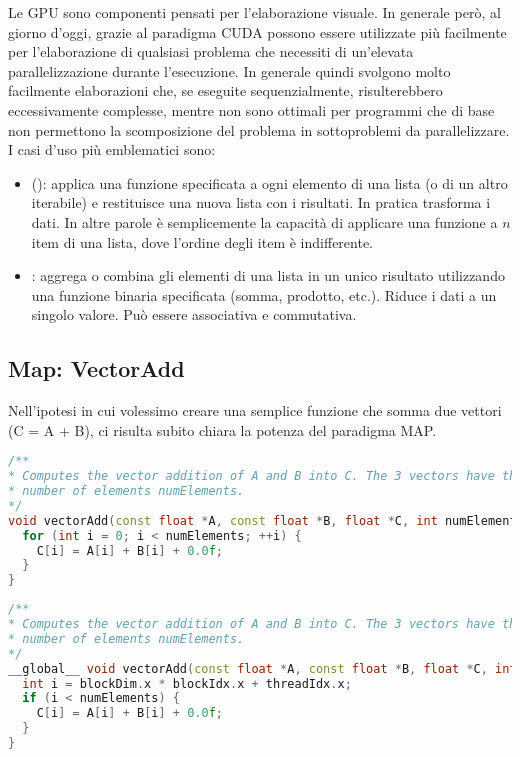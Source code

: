Le GPU sono componenti pensati per l'elaborazione visuale. In generale però, al giorno d'oggi, grazie al paradigma CUDA possono essere utilizzate più facilmente per l'elaborazione di qualsiasi problema che necessiti di un'elevata parallelizzazione durante l'esecuzione. In generale quindi svolgono molto facilmente elaborazioni che, se eseguite sequenzialmente, risulterebbero eccessivamente complesse, mentre non sono ottimali per programmi che di base non permettono la scomposizione del problema in sottoproblemi da parallelizzare. I casi d'uso più emblematici sono:

\begin{itemize}
  \item {} (): applica una funzione specificata a ogni elemento di una lista (o di un altro iterabile) e restituisce una nuova lista con i risultati. In pratica trasforma i dati. In altre parole è semplicemente la capacità di applicare una funzione a $n$ item di una lista, dove l'ordine degli item è indifferente.
  \item {}: aggrega o combina gli elementi di una lista in un unico risultato utilizzando una funzione binaria specificata (somma, prodotto, etc.). Riduce i dati a un singolo valore. Può essere associativa e commutativa.
\end{itemize}


\subsection{Map: VectorAdd}

Nell'ipotesi in cui volessimo creare una semplice funzione che somma due vettori (C = A + B), ci risulta subito chiara la potenza del paradigma MAP. 

\begin{lstlisting}[language=C++, caption={Implementazione sequenziale}]
/**
* Computes the vector addition of A and B into C. The 3 vectors have the same
* number of elements numElements.
*/
void vectorAdd(const float *A, const float *B, float *C, int numElements){
  for (int i = 0; i < numElements; ++i) {
    C[i] = A[i] + B[i] + 0.0f;
  }
}
\end{lstlisting}

\begin{lstlisting}[language=C++, caption={Implementazione CUDA}]
/**
* Computes the vector addition of A and B into C. The 3 vectors have the same
* number of elements numElements.
*/
__global__ void vectorAdd(const float *A, const float *B, float *C, int numElements) {
  int i = blockDim.x * blockIdx.x + threadIdx.x;
  if (i < numElements) {
    C[i] = A[i] + B[i] + 0.0f;
  }
}
\end{lstlisting}

